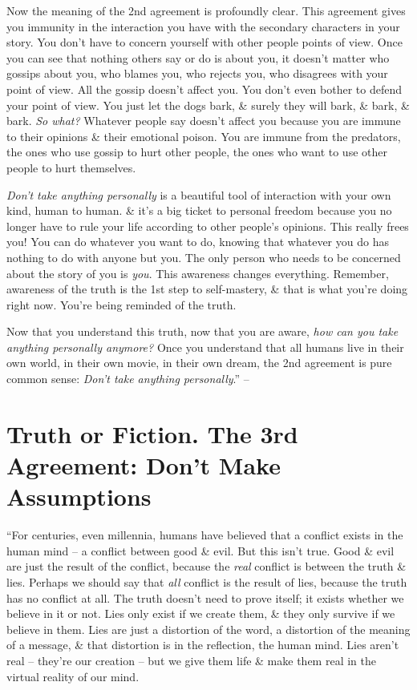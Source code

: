 \documentclass{article}
\numberwithin{equation}{section}
\begin{document}
Now the meaning of the 2nd agreement is profoundly clear. This agreement gives you immunity in the interaction you have with the secondary characters in your story. You don't have to concern yourself with other people points of view. Once you can see that nothing others say or do is about you, it doesn't matter who gossips about you, who blames you, who rejects you, who disagrees with your point of view. All the gossip doesn't affect you. You don't even bother to defend your point of view. You just let the dogs bark, \& surely they will bark, \& bark, \& bark. \textit{So what?} Whatever people say doesn't affect you because you are immune to their opinions \& their emotional poison. You are immune from the predators, the ones who use gossip to hurt other people, the ones who want to use other people to hurt themselves.

\textit{Don't take anything personally} is a beautiful tool of interaction with your own kind, human to human. \& it's a big ticket to personal freedom because you no longer have to rule your life according to other people's opinions. This really frees you! You can do whatever you want to do, knowing that whatever you do has nothing to do with anyone but you. The only person who needs to be concerned about the story of you is \textit{you}. This awareness changes everything. Remember, awareness of the truth is the 1st step to self-mastery, \& that is what you're doing right now. You're being reminded of the truth.

Now that you understand this truth, now that you are aware, \textit{how can you take anything personally anymore?} Once you understand that all humans live in their own world, in their own movie, in their own dream, the 2nd agreement is pure common sense: \textit{Don't take anything personally}.'' -- \cite[pp. 45--49]{Ruiz_Ruiz2011}


\section{Truth or Fiction. The 3rd Agreement: Don't Make Assumptions}
``For centuries, even millennia, humans have believed that a conflict exists in the human mind -- a conflict between good \& evil. But this isn't true. Good \& evil are just the result of the conflict, because the \textit{real} conflict is between the truth \& lies. Perhaps we should say that \textit{all} conflict is the result of lies, because the truth has no conflict at all. The truth doesn't need to prove itself; it exists whether we believe in it or not. Lies only exist if we create them, \& they only survive if we believe in them. Lies are just a distortion of the word, a distortion of the meaning of a message, \& that distortion is in the reflection, the human mind. Lies aren't real -- they're our creation -- but we give them life \& make them real in the virtual reality of our mind.
\end{document}
